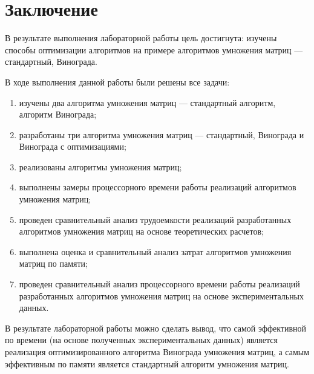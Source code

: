 \chapter*{Заключение}

В результате выполнения лабораторной работы цель достигнута: изучены способы оптимизации алгоритмов на примере алгоритмов умножения матриц --- стандартный, Винограда.

В ходе выполнения данной работы были решены все задачи:
\begin{enumerate}[label={\arabic*)}]
    \item изучены два алгоритма умножения матриц --- стандартный алгоритм, алгоритм Винограда;
	\item разработаны три алгоритма умножения матриц --- стандартный, Винограда и Винограда с оптимизациями;
	\item реализованы алгоритмы умножения матриц;
	\item выполнены замеры процессорного времени работы реализаций алгоритмов умножения матриц;
	\item проведен сравнительный анализ трудоемкости реализаций разработанных алгоритмов умножения матриц на основе теоретических расчетов;
	\item выполнена оценка и сравнительный анализ затрат алгоритмов умножения матриц по памяти; 
	\item проведен сравнительный анализ процессорного времени работы реализаций разработанных алгоритмов умножения матриц на основе экспериментальных данных.
\end{enumerate}

В результате лабораторной работы можно сделать вывод, что самой эффективной по времени (на основе полученных экспериментальных данных) является реализация оптимизированного алгоритма Винограда умножения матриц, а самым эффективным по памяти является стандартный алгоритм умножения матриц.